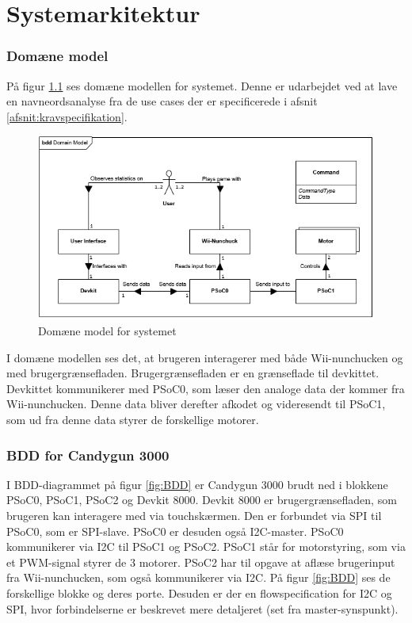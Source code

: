 \chapter{Systemarkitektur}

\subsection{Domæne model}
På figur \ref{fig:DomainModel} ses domæne modellen for systemet. Denne er udarbejdet ved at lave en navneordsanalyse fra de use cases der er specificerede i afsnit \ref{afsnit:kravspecifikation}.

\begin{figure}[H]
	\centering
	\includegraphics[width=\textwidth]{Systemarkitektur/images/DomainModel}
	\caption{Domæne model for systemet}
	\label{fig:DomainModel}
\end{figure}

I domæne modellen ses det, at brugeren interagerer med både Wii-nunchucken og med brugergrænsefladen. Brugergrænsefladen er en grænseflade til devkittet. Devkittet kommunikerer med PSoC0, som læser den analoge data der kommer fra Wii-nunchucken. Denne data bliver derefter afkodet og videresendt til PSoC1, som ud fra denne data styrer de forskellige motorer.

\subsection{BDD for Candygun 3000}
I BDD-diagrammet på figur \ref{fig:BDD} er Candygun 3000 brudt ned i blokkene PSoC0, PSoC1, PSoC2 og Devkit 8000. Devkit 8000 er brugergrænsefladen, som brugeren kan interagere med via touchskærmen. Den er forbundet via SPI til PSoC0, som er SPI-slave. PSoC0 er desuden også I2C-master. PSoC0 kommunikerer via I2C til PSoC1 og PSoC2. PSoC1 står for motorstyring, som via et PWM-signal styrer de 3 motorer. PSoC2 har til opgave at aflæse brugerinput fra Wii-nunchucken, som også kommunikerer via I2C. På figur \ref{fig:BDD} ses de forskellige blokke og deres porte. Desuden er der en flowspecification for I2C og SPI, hvor forbindelserne er beskrevet mere detaljeret (set fra master-synspunkt). 

